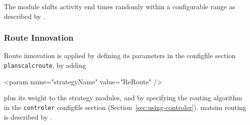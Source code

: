 The module shifts activity end times randomly within a configurable range as described by \citet[][]{BalmerRaneyEtAl2005act-times, Raney_PhDThesis_2005, Balmer_unpub_VSP_2004, BalmerEtAl_unpub_EIRASS_2004, BalmerEtAl_unpub_STRC_2004}. %

\subsubsection{Route Innovation}
\label{sec:routechoice}

Route innovation is applied by defining its parameters in the \gls{configfile} section \lstinline|planscalcroute|, by adding 
%
\begin{xml}
	<param name="strategyName" value="ReRoute" />
\end{xml}
%
plus its weight to the strategy modules, and by specifying the routing algorithm in the \lstinline|controler| \gls{configfile} section (Section~\ref{sec:using-controler}).
\gls{matsim} routing is described by \citet[]{LefebvreBalmer_unpub_STRC_2007}. 

%

